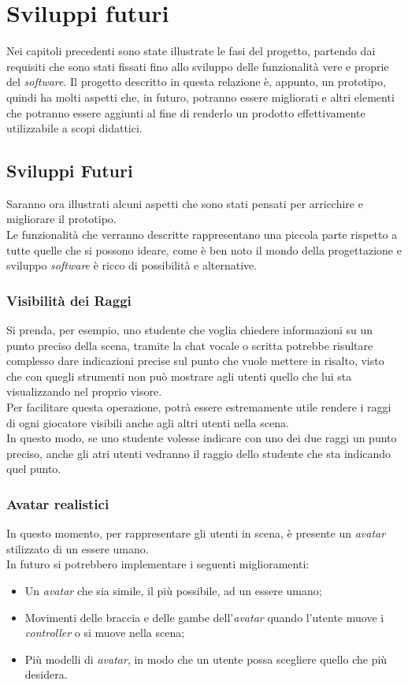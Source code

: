 \chapter{Sviluppi futuri}
Nei capitoli precedenti sono state illustrate le fasi del progetto, partendo dai requisiti che sono stati fissati fino allo sviluppo delle funzionalità vere e proprie del \textit{software}.
Il progetto descritto in questa relazione è, appunto, un prototipo, quindi ha molti aspetti che, in futuro, potranno essere migliorati e altri elementi che potranno essere aggiunti al fine di renderlo un prodotto effettivamente utilizzabile a scopi didattici.
\section{Sviluppi Futuri}
Saranno ora illustrati alcuni aspetti che sono stati pensati per arricchire e migliorare il prototipo.
\\Le funzionalità che verranno descritte rappresentano una piccola parte rispetto a tutte quelle che si possono ideare, come è ben noto il mondo della progettazione e sviluppo \textit{software} è ricco di possibilità e alternative.
\subsection{Visibilità dei Raggi}
Si prenda, per esempio, uno studente che voglia chiedere informazioni su un punto preciso della scena, tramite la chat vocale o scritta potrebbe risultare complesso dare indicazioni precise sul punto che vuole mettere in risalto, visto che con quegli strumenti non può mostrare agli utenti quello che lui sta visualizzando nel proprio visore. 
\\Per facilitare questa operazione, potrà essere estremamente utile rendere i raggi di ogni giocatore visibili anche agli altri utenti nella scena. 
\\In questo modo, se uno studente volesse indicare con uno dei due raggi un punto preciso, anche gli atri utenti vedranno il raggio dello studente che sta indicando quel punto.
\subsection{Avatar realistici}
In questo momento, per rappresentare gli utenti in scena, è presente un \textit{\gls{avatar}} stilizzato di un essere umano.
\\In futuro si potrebbero implementare i seguenti miglioramenti:
\begin{itemize}
    \item Un \textit{avatar} che sia simile, il più possibile, ad un essere umano;
    \item Movimenti delle braccia e delle gambe dell'\textit{avatar} quando l'utente muove i \textit{controller} o si muove nella scena;
    \item Più modelli di \textit{avatar}, in modo che un utente possa scegliere quello che più desidera.
\end{itemize}
